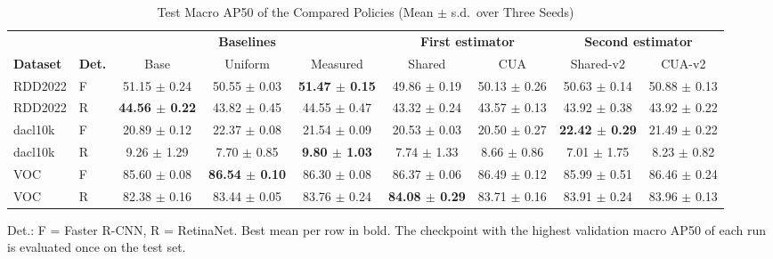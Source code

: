 \documentclass[conference]{IEEEtran}
\begin{document}
\begin{table}[t]
\caption{Test Macro AP50 of the Compared Policies (Mean $\pm$ s.d.\ over Three Seeds)}
\label{tab:main}
\centering
\footnotesize
\setlength{\tabcolsep}{4pt}
\begin{tabular}{@{}llccccccc@{}}
\toprule
 & & \multicolumn{3}{c}{\textbf{Baselines}} & \multicolumn{2}{c}{\textbf{First estimator}} & \multicolumn{2}{c}{\textbf{Second estimator}} \\
\cmidrule(lr){3-5}\cmidrule(lr){6-7}\cmidrule(l){8-9}
\textbf{Dataset} & \textbf{Det.} & Base & Uniform & Measured & Shared & CUA & Shared-v2 & CUA-v2 \\
\midrule
RDD2022 & F & 51.15 $\pm$ 0.24 & 50.55 $\pm$ 0.03 & \textbf{51.47 $\pm$ 0.15} & 49.86 $\pm$ 0.19 & 50.13 $\pm$ 0.26 & 50.63 $\pm$ 0.14 & 50.88 $\pm$ 0.13 \\
RDD2022 & R & \textbf{44.56 $\pm$ 0.22} & 43.82 $\pm$ 0.45 & 44.55 $\pm$ 0.47 & 43.32 $\pm$ 0.24 & 43.57 $\pm$ 0.13 & 43.92 $\pm$ 0.38 & 43.92 $\pm$ 0.22 \\
dacl10k & F & 20.89 $\pm$ 0.12 & 22.37 $\pm$ 0.08 & 21.54 $\pm$ 0.09 & 20.53 $\pm$ 0.03 & 20.50 $\pm$ 0.27 & \textbf{22.42 $\pm$ 0.29} & 21.49 $\pm$ 0.22 \\
dacl10k & R & 9.26 $\pm$ 1.29 & 7.70 $\pm$ 0.85 & \textbf{9.80 $\pm$ 1.03} & 7.74 $\pm$ 1.33 & 8.66 $\pm$ 0.86 & 7.01 $\pm$ 1.75 & 8.23 $\pm$ 0.82 \\
VOC & F & 85.60 $\pm$ 0.08 & \textbf{86.54 $\pm$ 0.10} & 86.30 $\pm$ 0.08 & 86.37 $\pm$ 0.06 & 86.49 $\pm$ 0.12 & 85.99 $\pm$ 0.51 & 86.46 $\pm$ 0.24 \\
VOC & R & 82.38 $\pm$ 0.16 & 83.44 $\pm$ 0.05 & 83.76 $\pm$ 0.24 & \textbf{84.08 $\pm$ 0.29} & 83.71 $\pm$ 0.16 & 83.91 $\pm$ 0.24 & 83.96 $\pm$ 0.13 \\
\bottomrule
\end{tabular}
\vspace{2pt}

\parbox{\textwidth}{\footnotesize Det.: F = Faster R-CNN, R = RetinaNet. Best mean per row in bold. The checkpoint with the highest validation macro AP50 of each run is evaluated once on the test set.}
\end{table}
\end{document}
